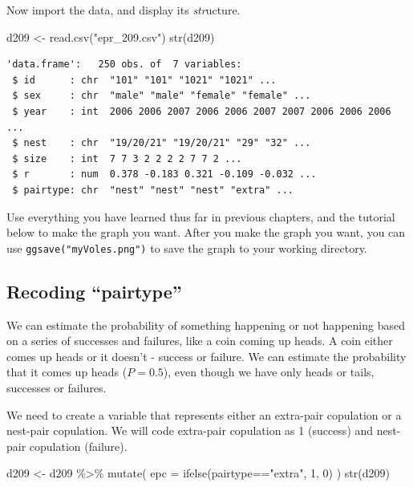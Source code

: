 \documentclass[
  letterpaper,
  DIV=11,
  numbers=noendperiod]{scrreprt}
\newenvironment{Shaded}{\begin{snugshade}}{\end{snugshade}}
\newcommand{\AttributeTok}[1]{\textcolor[rgb]{0.40,0.45,0.13}{#1}}
\newcommand{\DecValTok}[1]{\textcolor[rgb]{0.68,0.00,0.00}{#1}}
\newcommand{\FunctionTok}[1]{\textcolor[rgb]{0.28,0.35,0.67}{#1}}
\newcommand{\NormalTok}[1]{\textcolor[rgb]{0.00,0.23,0.31}{#1}}
\newcommand{\OtherTok}[1]{\textcolor[rgb]{0.00,0.23,0.31}{#1}}
\newcommand{\SpecialCharTok}[1]{\textcolor[rgb]{0.37,0.37,0.37}{#1}}
\newcommand{\StringTok}[1]{\textcolor[rgb]{0.13,0.47,0.30}{#1}}
\begin{document}
Now import the data, and display its \emph{str}ucture.

\begin{Shaded}
\begin{Highlighting}[]
\NormalTok{d209 }\OtherTok{\textless{}{-}} \FunctionTok{read.csv}\NormalTok{(}\StringTok{"epr\_209.csv"}\NormalTok{)}
\FunctionTok{str}\NormalTok{(d209)}
\end{Highlighting}
\end{Shaded}

\begin{verbatim}
'data.frame':   250 obs. of  7 variables:
 $ id      : chr  "101" "101" "1021" "1021" ...
 $ sex     : chr  "male" "male" "female" "female" ...
 $ year    : int  2006 2006 2007 2006 2006 2007 2007 2006 2006 2006 ...
 $ nest    : chr  "19/20/21" "19/20/21" "29" "32" ...
 $ size    : int  7 7 3 2 2 2 2 7 7 2 ...
 $ r       : num  0.378 -0.183 0.321 -0.109 -0.032 ...
 $ pairtype: chr  "nest" "nest" "nest" "extra" ...
\end{verbatim}

Use everything you have learned thus far in previous chapters, and the
tutorial below to make the graph you want. After you make the graph you
want, you can use \texttt{ggsave("myVoles.png")} to save the graph to
your working directory.

\subsection{Recoding ``pairtype''}\label{recoding-pairtype}

We can estimate the probability of something happening or not happening
based on a series of successes and failures, like a coin coming up
heads. A coin either comes up heads or it doesn't - success or failure.
We can estimate the probability that it comes up heads (\(P = 0.5\)),
even though we have only heads or tails, successes or failures.

We need to create a variable that represents either an extra-pair
copulation or a nest-pair copulation. We will code extra-pair copulation
as 1 (success) and nest-pair copulation (failure).

\begin{Shaded}
\begin{Highlighting}[]
\NormalTok{d209 }\OtherTok{\textless{}{-}}\NormalTok{ d209 }\SpecialCharTok{\%\textgreater{}\%}
  \FunctionTok{mutate}\NormalTok{(}
    \AttributeTok{epc =} \FunctionTok{ifelse}\NormalTok{(pairtype}\SpecialCharTok{==}\StringTok{"extra"}\NormalTok{, }\DecValTok{1}\NormalTok{, }\DecValTok{0}\NormalTok{)}
\NormalTok{  )}
\FunctionTok{str}\NormalTok{(d209)}
\end{Highlighting}
\end{Shaded}
\end{document}
